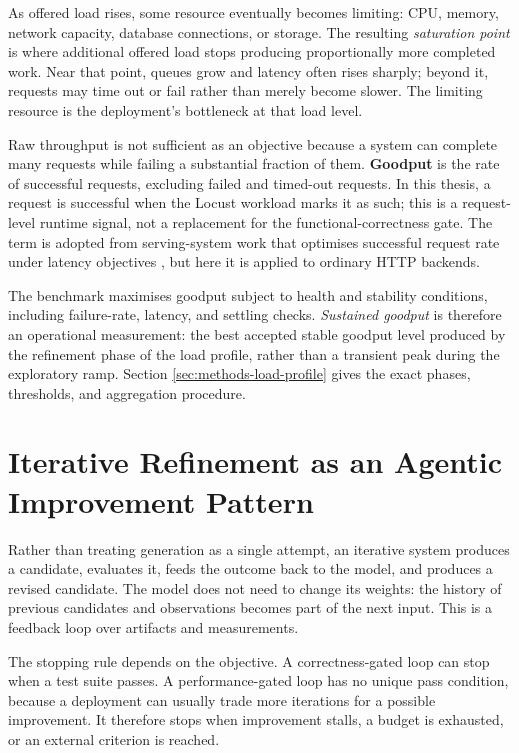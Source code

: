 As offered load rises, some resource eventually becomes limiting: CPU, memory,
network capacity, database connections, or storage. The resulting
\emph{saturation point} is where additional offered load stops producing
proportionally more completed work. Near that point, queues grow and latency
often rises sharply; beyond it, requests may time out or fail rather than
merely become slower. The limiting resource is the deployment's bottleneck at
that load level.

Raw throughput is not sufficient as an objective because a system can complete
many requests while failing a substantial fraction of them. \textbf{Goodput}
is the rate of successful requests, excluding failed and timed-out requests.
In this thesis, a request is successful when the Locust workload marks it as
such; this is a request-level runtime signal, not a replacement for the
functional-correctness gate. The term is adopted from serving-system work that
optimises successful request rate under latency objectives
\cite{zhong2024distserve}, but here it is applied to ordinary HTTP backends.

The benchmark maximises goodput subject to health and stability conditions,
including failure-rate, latency, and settling checks. \emph{Sustained
goodput} is therefore an operational measurement: the best accepted stable
goodput level produced by the refinement phase of the load profile, rather
than a transient peak during the exploratory ramp. Section
\ref{sec:methods-load-profile} gives the exact phases, thresholds, and
aggregation procedure.


\section{Iterative Refinement as an Agentic Improvement Pattern}
\label{sec:background-iterative-refinement}

Rather than treating generation as a single attempt, an iterative system
produces a candidate, evaluates it, feeds the outcome back to the model, and
produces a revised candidate. The model does not need to change its weights:
the history of previous candidates and observations becomes part of the next
input. This is a feedback loop over artifacts and measurements.

The stopping rule depends on the objective. A correctness-gated loop can stop
when a test suite passes. A performance-gated loop has no unique pass
condition, because a deployment can usually trade more iterations for a
possible improvement. It therefore stops when improvement stalls, a budget is
exhausted, or an external criterion is reached.


